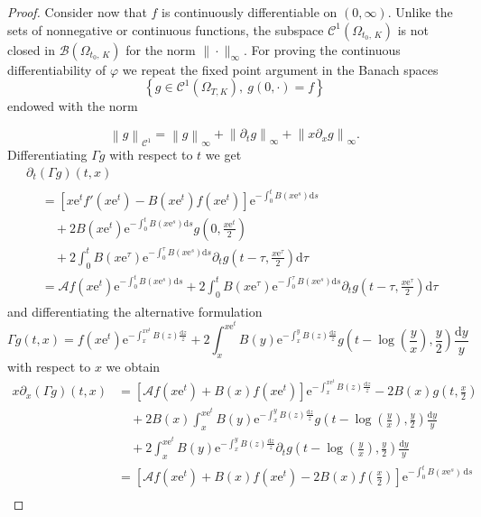 \documentclass[AHL,Unicode,longabstracts,published]{cedram}
\newcommand{\p}{\partial}
\newcommand{\Cr}{\mathcal{C}}
\newcommand{\A}{\mathcal{A}}
\newcommand{\B}{\mathcal{B}}
\newcommand{\f}{\frac}
\newcommand{\1}{\mathds{1}}
\newcommand{\e}{\mathrm{e}}
\renewcommand{\d}{\mathrm{d}}
\begin{document}
\begin{proof}

Consider now that $f$ is continuously differentiable on $(0,\infty).$ Unlike the sets of nonnegative or continuous functions, the subspace $\Cr^1(\Omega_{t_0,\,K})$ is not closed in $\B(\Omega_{t_0,\,K})$ for the norm $\|\cdot\|_\infty.$ For proving the continuous differentiability of $\varphi$ we repeat the fixed point argument in the Banach spaces
\[
\left\{g\in \Cr^1\left(\Omega_{T,K}\right),\ g(0,\cdot)=f\right\}
\]
endowed with the norm

\[
\left\|g\right\|_{\Cr^1}=\left\|g\right\|_\infty+\left\|\partial_tg\right\|_\infty+\left\|x\partial_xg\right\|_\infty.
\]
Differentiating $\Gamma g$ with respect to $t$ we get
\begin{multline}\label{eq:dtGammag}
\p_t(\Gamma g)(t,x)\\
\begin{aligned}
&=\left[x\e^tf'\left(x\e^t\right) - B\left(x\e^t\right)f\left(x\e^t\right)\right]\e^{-\int_0^t B\left(x\e^s\right)\d s}\\
&\quad+ 2B\left(x\e^t\right)\e^{-\int_0^t B\left(x\e^s\right)\d s}g\left(0,\frac{x\e^t}{2}\right)\\
&\quad + 2\int_0^t B\left(x\e^\tau\right)\e^{-\int_0^\tau B\left(x\e^s\right)\d s} \p_t g\left(t-\tau,\frac{x\e^\tau}{2}\right)\d \tau\\
&=\A f\left(x\e^t\right)\e^{-\int_0^t B\left(x\e^s\right)\d s} + 2\int_0^t B\left(x\e^\tau\right)\e^{-\int_0^\tau B\left(x\e^s\right)\d s} \p_t g\left(t-\tau,\frac{x\e^\tau}{2}\right)\d \tau 
\end{aligned}
\end{multline}
and differentiating the alternative formulation
\[
\Gamma g(t,x)=f\left(x\e^t\right)\e^{-\int_x^{x\e^t} B(z)\frac{\d z}{z}} + 2\int_x^{x\e^t} B(y)\e^{-\int_x^y B(z)\f{\d z}{z}}g\left(t-\log\left(\frac{y}{x}\right),\frac{y}{2}\right) \f{\d y}{y}
\]
with respect to $x$ we obtain
\begin{align*}
x\partial_x(\Gamma g)(t,x)&=\left[\A f\left(x\e^t\right)+B(x)f\left(x\e^t\right)\right]\e^{-\int_x^{x\e^t} B(z)\frac{\d z}{z}}-2B(x)g\left(t,\frac x2\right)\\
&\quad+2B(x)\int_x^{x\e^t} B(y)\e^{-\int_x^y B(z)\f{\d z}{z}}g\left(t-\log\left(\frac{y}{x}\right),\frac{y}{2}\right) \f{\d y}{y}\\
&\quad+2\int_x^{x\e^t} B(y)\e^{-\int_x^y B(z)\f{\d z}{z}}\partial_tg\left(t-\log\left(\frac{y}{x}\right),\frac{y}{2}\right) \f{\d y}{y}\\
&=\left[\A f\left(x\e^t\right)+B(x)f\left(x\e^t\right)-2B(x)f\left(\frac x2\right)\right]\e^{-\int_0^t B\left(x\e^s\right)\,\d s}\\

\end{align*}
\end{proof}
\end{document}
